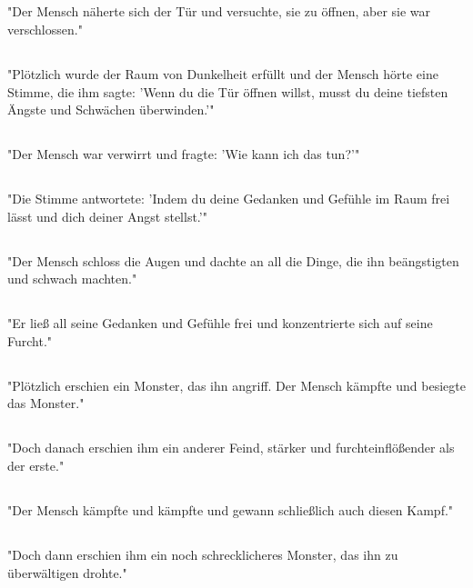 \documentclass{article}
\begin{document}
\subsection{}
"Der Mensch näherte sich der Tür und versuchte, sie zu öffnen, aber sie war verschlossen."
\subsection{}
"Plötzlich wurde der Raum von Dunkelheit erfüllt und der Mensch hörte eine Stimme, die ihm sagte: 'Wenn du die Tür öffnen willst, musst du deine tiefsten Ängste und Schwächen überwinden.'"
\subsection{}
"Der Mensch war verwirrt und fragte: 'Wie kann ich das tun?'"
\subsection{}
"Die Stimme antwortete: 'Indem du deine Gedanken und Gefühle im Raum frei lässt und dich deiner Angst stellst.'"
\subsection{}
"Der Mensch schloss die Augen und dachte an all die Dinge, die ihn beängstigten und schwach machten."
\subsection{}
"Er ließ all seine Gedanken und Gefühle frei und konzentrierte sich auf seine Furcht."
\subsection{}
"Plötzlich erschien ein Monster, das ihn angriff. Der Mensch kämpfte und besiegte das Monster."
\subsection{}
"Doch danach erschien ihm ein anderer Feind, stärker und furchteinflößender als der erste."
\subsection{}
"Der Mensch kämpfte und kämpfte und gewann schließlich auch diesen Kampf."
\subsection{}
"Doch dann erschien ihm ein noch schrecklicheres Monster, das ihn zu überwältigen drohte."
\end{document}
